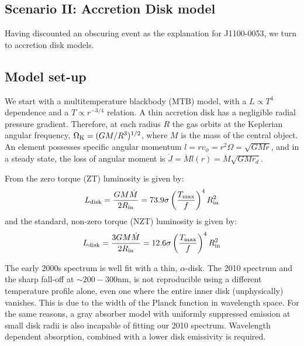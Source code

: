 \documentclass[11pt,a4paper]{article}
\begin{document}
\subsection*{Scenario II: Accretion Disk model}
Having discounted an obscuring event as the explanation for
J1100-0053, we turn to accretion disk models.

\subsection{Model set-up}
We start with a multitemperature blackbody (MTB) model, with a $L \propto T^4$ dependence and a $T \propto r^{-3/4}$ relation. A thin accretion disk has a negligible radial pressure gradient. Therefore, at each radius $R$ the gas orbits at the Keplerian angular frequency, $\Omega_{\rm K} = (GM/R^{3})^{1/2}$, where $M$ is the mass of the central object.  An element possesses specific angular momentum $l = r v_{\phi} = r^{2} \Omega = \sqrt{GMr}$, and in a steady state, the loss of angular moment is $\dot{J} = \dot{M} l(r) = \dot{M} \sqrt{GMr_{d}}$.



From \cite{Zimmerman2005} the zero torque (ZT) luminosity is given by:
\begin{equation}
L_{\rm disk}   =  \frac{G M \dot{M}}  {2 R_{\rm in}}    = 73.9 \sigma\left ( \frac{T_{\rm max}}{f}  \right )^{4}  R^{2}_{\rm in} 
\end{equation}
and the standard, non-zero torque (NZT) luminosity is given by:
\begin{equation}
L_{\rm disk} = \frac{3 G M \dot{M}}  {2 R_{\rm in}}    = 12.6 \sigma\left ( \frac{T_{\rm max}}{f}  \right )^{4}  R^{2}_{\rm in} 
\end{equation} 

The early 2000s spectrum is well fit with a thin, \citet{SS73} $\alpha$-disk. The 2010 spectrum and the sharp fall-off at $\sim 200-300$nm, is not reproducible using a different temperature profile alone, even one where the entire inner disk (unphysically) vanishes. This is due to the width of the Planck function in wavelength space. For the same reasons, a gray absorber model with uniformly suppressed emission at small disk radii is also incapable of fitting our 2010 \citep[or ][]{Guo2016} spectrum. Wavelength dependent absorption, combined with a lower disk emissivity is required. 
\end{document}
